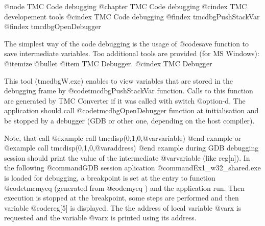 @node TMC Code debugging
@chapter TMC Code debugging
@cindex TMC developement tools
@cindex TMC Code debugging
@findex tmcdbgPushStackVar
@findex tmcdbgOpenDebugger

The simplest way of the code debugging is the usage of @code{save} function to save intermediate variables. 
Too additional tools are provided (for MS Windows):
@itemize @bullet
@item TMC Debugger.
@cindex TMC Debugger

This tool (tmcdbgW.exe) enables to view variables that are stored in the debugging frame by @code{tmcdbgPushStackVar} function.
Calls to this function are generated by TMC Converter if it was called with switch @option{-d}.
The application should call @code{tmcdbgOpenDebugger} function at initialisation and be stopped by a debugger (GDB or other one, depending on 
the host compiler). 


 Note, that call
@example
call tmcdisp(0,1,0,@var{variable})
@end example
or
@example
call tmcdisp(0,1,0,@var{address})
@end example
during GDB debugging session should print the value of the intermediate @var{variable} (like reg[n]). In 
the following @command{GDB} session aplication @command{Ex1_w32_shared.exe} is loaded for debugging,
a breakpoint is set at the entry to function @code{tmcmyeq} (generated from @code{myeq} ) and the application run.
Then execution is stopped at the breakpoint, some steps are performed and then variable @code{reg[5]} is displayed. 
The the address of local variable @var{x} is requested and the variable @var{x} is printed using its address.

